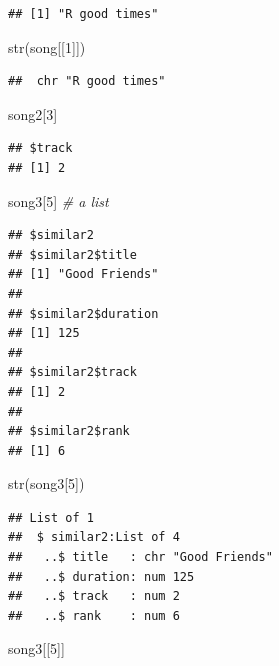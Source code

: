 \documentclass[
]{book}
\newenvironment{Shaded}{\begin{snugshade}}{\end{snugshade}}
\newcommand{\CommentTok}[1]{\textcolor[rgb]{0.56,0.35,0.01}{\textit{#1}}}
\newcommand{\DecValTok}[1]{\textcolor[rgb]{0.00,0.00,0.81}{#1}}
\newcommand{\FunctionTok}[1]{\textcolor[rgb]{0.00,0.00,0.00}{#1}}
\newcommand{\NormalTok}[1]{#1}
\begin{document}
\begin{verbatim}
## [1] "R good times"
\end{verbatim}

\begin{Shaded}
\begin{Highlighting}[]
\FunctionTok{str}\NormalTok{(song[[}\DecValTok{1}\NormalTok{]])}
\end{Highlighting}
\end{Shaded}

\begin{verbatim}
##  chr "R good times"
\end{verbatim}

\begin{Shaded}
\begin{Highlighting}[]
\NormalTok{song2[}\DecValTok{3}\NormalTok{]}
\end{Highlighting}
\end{Shaded}

\begin{verbatim}
## $track
## [1] 2
\end{verbatim}

\begin{Shaded}
\begin{Highlighting}[]
\NormalTok{song3[}\DecValTok{5}\NormalTok{]  }\CommentTok{\# a list}
\end{Highlighting}
\end{Shaded}

\begin{verbatim}
## $similar2
## $similar2$title
## [1] "Good Friends"
## 
## $similar2$duration
## [1] 125
## 
## $similar2$track
## [1] 2
## 
## $similar2$rank
## [1] 6
\end{verbatim}

\begin{Shaded}
\begin{Highlighting}[]
\FunctionTok{str}\NormalTok{(song3[}\DecValTok{5}\NormalTok{])}
\end{Highlighting}
\end{Shaded}

\begin{verbatim}
## List of 1
##  $ similar2:List of 4
##   ..$ title   : chr "Good Friends"
##   ..$ duration: num 125
##   ..$ track   : num 2
##   ..$ rank    : num 6
\end{verbatim}

\begin{Shaded}
\begin{Highlighting}[]
\NormalTok{song3[[}\DecValTok{5}\NormalTok{]]}
\end{Highlighting}
\end{Shaded}
\end{document}
